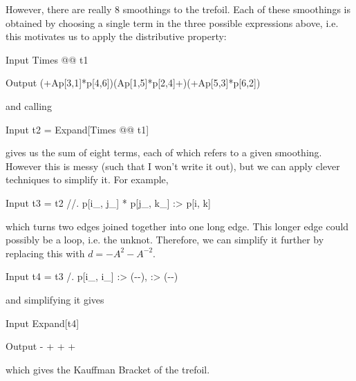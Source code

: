 \documentclass{article}
\begin{document}
However, there are really $8$ smoothings to the trefoil. Each of these smoothings is obtained by choosing a single term in the three possible expressions above, i.e. this motivates us to apply the distributive property:
\begin{mmaCell}{Input}
    Times @@ t1
\end{mmaCell}
\begin{mmaCell}{Output}
    (+Ap[3,1]*p[4,6])(Ap[1,5]*p[2,4]+)(+Ap[5,3]*p[6,2])
\end{mmaCell}
and calling
\begin{mmaCell}{Input}
    t2 = Expand[Times @@ t1]
\end{mmaCell}
gives us the sum of eight terms, each of which refers to a given smoothing. However this is messy (such that I won't write it out), but we can apply clever techniques to simplify it. For example,
\begin{mmaCell}{Input}
    t3 = t2 //. {p[i_, j_] * p[j_, k_] :> p[i, k]}
\end{mmaCell}
which turns two edges joined together into one long edge. This longer edge could possibly be a loop, i.e. the unknot. Therefore, we can simplify it further by replacing this with $d=-A^2-A^{-2}.$
\begin{mmaCell}{Input}
    t4 = t3 /. {p[i_, i_] :> (--),  :> (--)}
\end{mmaCell}
and simplifying it gives
\begin{mmaCell}{Input}
    Expand[t4]
\end{mmaCell}
\begin{mmaCell}{Output}
    - +  +  + 
\end{mmaCell}
which gives the Kauffman Bracket of the trefoil.
\end{document}
